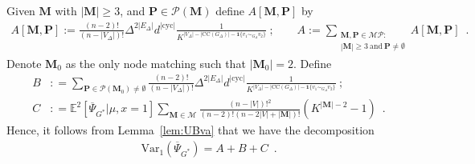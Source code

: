 \documentclass{article}
\begin{document}
Given $\mathbf{M}$ with $|\mathbf{M}|\geq 3$, and $\mathbf{P}\in \mathcal{P}(\mathbf{M})$ define $A[\mathbf{M},\mathbf{P}]$ by 
\begin{align}\label{eq:definition:A:M:P}
 A[\mathbf{M},\mathbf{P}] :=  \frac{(n-2)!}{(n-|V_{\Delta}|)!} \Delta^{2|E_{\Delta}|}d^{|\mathrm{cyc}|}\frac{1}{K^{|V_{\Delta}|-|\mathrm{CC}(G_{\Delta})|-\mathbf{1}\{v_1 \sim_{G_\Delta} v_2\}}}\ ; \quad \quad A:=\sum_{\substack{\mathbf{M},\mathbf{P}\in \mathcal{MP}:\\|\mathbf{M}|\geq 3~\mathrm{and}~\mathbf{P} \neq \emptyset}} A[\mathbf{M},\mathbf{P}]\enspace .
\end{align}
Denote $\mathbf{M}_0$ as the only node matching such that $|\mathbf{M}_0|=2$. Define
\begin{align*}
B&: = \sum_{\mathbf{P}\in \mathcal{P}(\mathbf{M}_0)\neq \emptyset} \frac{(n-2)!}{(n-|V_{\Delta}|)!} \Delta^{2|E_{\Delta}|}d^{|\mathrm{cyc}|}\frac{1}{K^{|V_{\Delta}|-|\mathrm{CC}(G_{\Delta})|-\mathbf{1}\{v_1 \sim_{G_\Delta} v_2\}}}\ ; \\
C &: = \mathbb E^2[\overline{\Psi}_{G^*}|\mu,x=1]   \sum_{\mathbf{M}\in  \mathcal{M} }   \frac{(n-|V|)!^2}{(n-2)!(n-2|V|+|\mathbf{M}|)! } \left(K^{|\mathbf{M}|- 2}-1\right)\enspace . 
\end{align*}
Hence, it follows from Lemma~\ref{lem:UBva} that we have the decomposition 
\begin{align}\label{eq:decomposition_V1}
\mathrm{Var}_1(\overline{\Psi}_{G^*})= A  + B + C\enspace .
\end{align}
\end{document}
